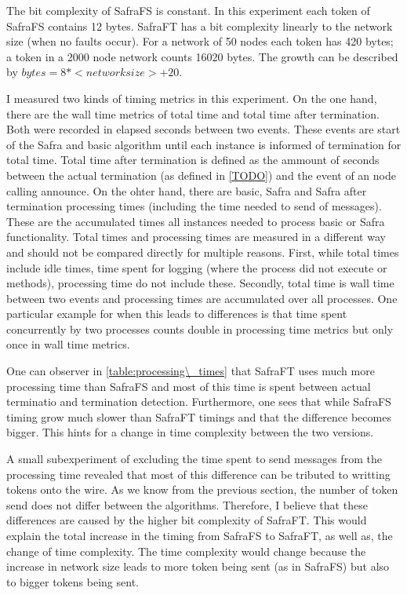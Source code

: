 The bit complexity of SafraFS is constant.
In this experiment each token of SafraFS contains 12 bytes.
SafraFT has a bit complexity linearly to the network size (when no faults occur).
For a network of 50 nodes each token has 420 bytes; a token in a 2000 node network counts 16020 bytes.
The growth can be described by $bytes = 8 * <network size> + 20$.

I measured two kinds of timing metrics in this experiment.
On the one hand, there are the wall time metrics of total time and total time after termination.
Both were recorded in elapsed seconds between two events. 
These events are start of the Safra and basic algorithm until each instance is informed of termination for total time. 
Total time after termination is defined as the ammount of seconds between the actual termination (as defined in \cref{TODO}) and the event of an node calling
announce. %
On the ohter hand, there are basic, Safra and Safra after termination processing times (including the time needed to send of messages).
These are the accumulated times all instances needed to process basic or Safra functionality.
Total times and processing times are measured in a different way and should not be compared directly for multiple reasons. 
First, while total times include idle times, time spent for logging (where the process did not execute or methods), processing time do not include these.
Secondly, total time is wall time between two events and processing times are accumulated over all processes. 
One particular example for when this leads to differences is that time spent concurrently by two processes counts double in processing time metrics but only once in wall time metrics.

One can observer in \cref{table:processing\_times} that SafraFT uses much more processing time than SafraFS and most of this time is spent between actual terminatio and termination detection.
Furthermore, one sees that while SafraFS timing grow much slower than SafraFT timings and that the difference becomes bigger. 
This hints for a change in time complexity between the two versions.

A small subexperiment of excluding the time spent to send messages from the processing time revealed that most of this difference can be tributed to writting tokens onto the wire. %
As we know from the previous section, the number of token send does not differ between the algorithms.
Therefore, I believe that these differences are caused by the higher bit complexity of SafraFT. 
This would explain the total increase in the timing from SafraFS to SafraFT, as well as, the change of time complexity.
The time complexity would change because the increase in network size leads to more token being sent (as in SafraFS) but also to bigger tokens being sent.

